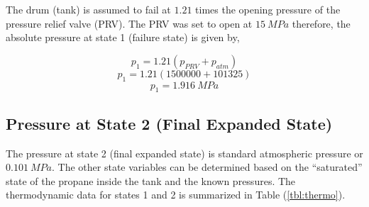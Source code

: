\documentclass[10pt,parskip=half,
toc=sectionentrywithdots,
bibliography=totocnumbered,
captions=tableheading,numbers=noendperiod]{scrartcl}
\begin{document}
The drum (tank) is assumed to fail at \(1.21\) times the opening
pressure of the pressure relief valve (PRV)\cite{Engineers2013}. The PRV
was set to open at \(15\:MPa\) therefore, the absolute pressure at state
1 (failure state) is given by,

\begin{equation}p_1 = 1.21\left(p_{PRV}+p_{atm}\right)\end{equation}
\begin{equation}p_1 = 1.21\left(1500000+101325\right)\end{equation}
\begin{equation}p_1 = 1.916\:MPa\end{equation}

\hypertarget{pressure-at-state-2-final-expanded-state}{%
\subsection{Pressure at State 2 (Final Expanded
State)}\label{pressure-at-state-2-final-expanded-state}}

The pressure at state 2 (final expanded state) is standard atmospheric
pressure or \(0.101\:MPa\). The other state variables can be determined
based on the ``saturated'' state of the propane inside the tank and the
known pressures. The thermodynamic data for states 1 and 2 is summarized
in Table (\cref{tbl:thermo}).
\end{document}
